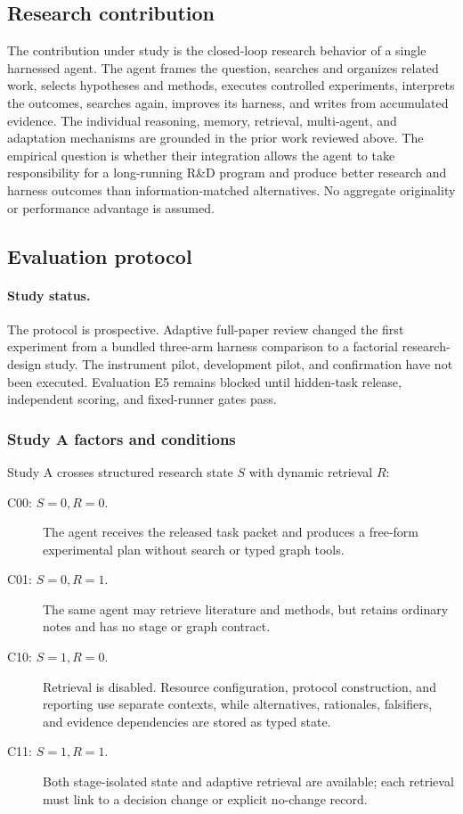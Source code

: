 \documentclass[11pt,a4paper]{article}
\begin{document}
\subsection{Research contribution}

The contribution under study is the closed-loop research behavior of a single
harnessed agent.  The agent frames the question, searches and organizes related work,
selects hypotheses and methods, executes controlled experiments, interprets the
outcomes, searches again, improves its harness, and writes from accumulated
evidence.  The individual reasoning, memory, retrieval, multi-agent, and
adaptation mechanisms are grounded in the prior work reviewed above.  The
empirical question is whether their integration allows the agent to take
responsibility for a long-running R\&D program and produce better research and
harness outcomes than information-matched alternatives.  No aggregate
originality or performance advantage is assumed.

\subsection{Evaluation protocol}

\paragraph{Study status.}
The protocol is prospective.  Adaptive full-paper review changed the first
experiment from a bundled three-arm harness comparison to a factorial research-
design study.  The instrument pilot, development pilot, and confirmation have
not been executed.  Evaluation E5 remains blocked until hidden-task release,
independent scoring, and fixed-runner gates pass.

\subsubsection{Study A factors and conditions}

Study A crosses structured research state $S$ with dynamic retrieval $R$:

\begin{description}
  \item[C00: $S=0,R=0$.] The agent receives the released task packet and
  produces a free-form experimental plan without search or typed graph tools.
  \item[C01: $S=0,R=1$.] The same agent may retrieve literature and methods,
  but retains ordinary notes and has no stage or graph contract.
  \item[C10: $S=1,R=0$.] Retrieval is disabled.  Resource configuration,
  protocol construction, and reporting use separate contexts, while alternatives,
  rationales, falsifiers, and evidence dependencies are stored as typed state.
  \item[C11: $S=1,R=1$.] Both stage-isolated state and adaptive retrieval are
  available; each retrieval must link to a decision change or explicit no-change
  record.
\end{description}
\end{document}
